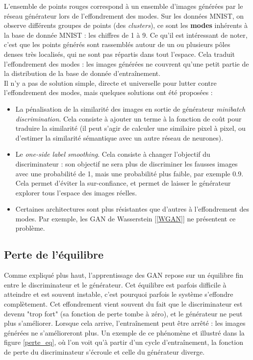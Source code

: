 L'ensemble de points rouges correspond à un ensemble d'images générées par le réseau générateur lors de l'effondrement des modes. Sur les données MNIST, on observe différents groupes de points (des \textit{clusters}), ce sont les \textbf{modes} inhérents à la base de donnée MNIST : les chiffres de 1 à 9. Ce qu'il est intéressant de noter, c'est que les points générés sont rassemblés autour de un ou plusieurs pôles denses très localisés, qui ne sont pas répartis dans tout l'espace. Cela traduit l'effondrement des modes : les images générées ne couvrent qu'une petit partie de la distribution de la base de donnée d’entraînement.\\

Il n'y a pas de solution simple, directe et universelle pour lutter contre l'effondrement des modes, mais quelques solutions ont été proposées :
\begin{itemize}
  \item La pénalisation de la similarité des images en sortie de générateur \textit{minibatch discrimination}. Cela consiste à ajouter un terme à la fonction de coût pour traduire la similarité (il peut s'agir de calculer une similaire pixel à pixel, ou d'estimer la similarité sémantique avec un autre réseau de neurones).
  \item Le \textit{one-side label smoothing}. Cela consiste à changer l'objectif du discriminateur : son objectif ne sera plus de discriminer les fausses images avec une probabilité de 1, mais une probabilité plus faible, par exemple 0.9. Cela permet d'éviter la sur-confiance, et permet de laisser le générateur explorer tous l'espace des images réelles.
  \item Certaines architectures sont plus résistantes que d'autres à l'effondrement des modes. Par exemple, les GAN de Wasserstein [\ref{WGAN}] ne présentent ce problème. 
\end{itemize}


\subsection{Perte de l'équilibre}

Comme expliqué plus haut, l'apprentissage des GAN repose sur un équilibre fin entre le discriminateur et le générateur. Cet équilibre est parfois difficile à atteindre et est souvent instable, c'est pourquoi parfois le système s'effondre complètement. Cet effondrement vient souvent du fait que le discriminateur est devenu "trop fort" (sa fonction de perte tombe à zéro), et le générateur ne peut plus s'améliorer. Lorsque cela arrive, l’entraînement peut être arrêté : les images générées ne s'amélioreront plus. Un exemple de ce phénomène et illustré dans la figure \ref{perte_eq}, où l'on voit qu'à partir d'un cycle d’entraînement, la fonction de perte du discriminateur s'écroule et celle du générateur diverge.

